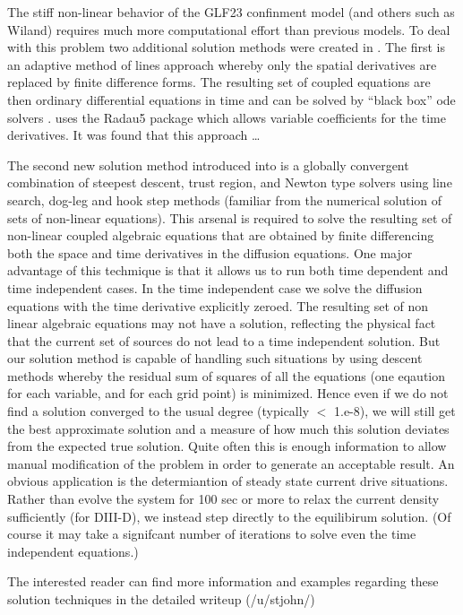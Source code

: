 The stiff non-linear behavior of the GLF23 confinment model (and others such as
Wiland) requires much more computational effort than previous models. To deal
with this problem two additional solution methods were created in \ot. The first
is an adaptive method of lines approach whereby only the spatial derivatives are
replaced by finite difference forms. The resulting set of coupled equations are
then ordinary differential equations in time and can be solved by ``black box''
ode solvers . \ot uses the Radau5 package which allows variable coefficients for
the time derivatives. It was found that this approach \ldots

The second new solution method introduced into \ot is a globally convergent
combination of steepest descent, trust region, and Newton type solvers using
line search, dog-leg and hook step methods (familiar from the numerical solution
of sets of non-linear equations). This arsenal is required to solve the
resulting set of non-linear coupled algebraic equations that are obtained by
finite differencing both the space and time derivatives in the diffusion
equations. One major advantage of this techmique is that it allows us to run
both time dependent and time independent cases. In the time independent case we
solve the diffusion equations with the time derivative explicitly zeroed. The
resulting set of non linear algebraic equations may not have a solution,
reflecting the physical fact that the current set of sources do not lead to a
time independent solution. But our solution method is capable of handling such
situations by using descent methods whereby the residual sum of squares of all
the equations  (one eqaution for each variable, and for each grid point) is
minimized. Hence even if we do not find a solution converged to the usual degree
(typically $<$ 1.e-8), we will still get the best approximate solution and a
measure of how much this solution deviates from the expected true solution. 
Quite often this is enough information to allow  manual modification of the
problem in order to generate an acceptable result. An obvious application is the
determiantion of steady state current drive  situations. Rather than evolve the
system for 100 sec or more to relax  the current density sufficiently (for
DIII-D), we instead step directly to the equilibirum solution. (Of course it may
take a signifcant number of iterations to solve even the time independent
equations.)

The interested reader can find more information and examples  regarding these
solution techniques in the detailed \ot writeup (/u/stjohn/)

